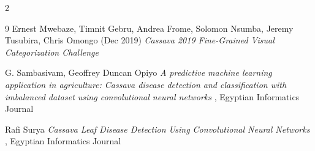 \documentclass[10pt]{article}
\begin{document}
\begin{multicols*}{2}
\begin{thebibliography}{9}
Ernest Mwebaze, Timnit Gebru, Andrea Frome, Solomon Nsumba, Jeremy Tusubira, Chris Omongo (Dec 2019) \emph{Cassava 2019 Fine-Grained Visual Categorization Challenge }

G. Sambasivam, Geoffrey Duncan Opiyo  \emph{A predictive machine learning application in agriculture: Cassava disease detection and classification with imbalanced dataset using convolutional
neural networks }, {Egyptian Informatics Journal}

Rafi Surya  \emph{Cassava Leaf Disease Detection Using
Convolutional Neural Networks }, {Egyptian Informatics Journal}
\end{thebibliography}


\end{multicols*}
\end{document}
